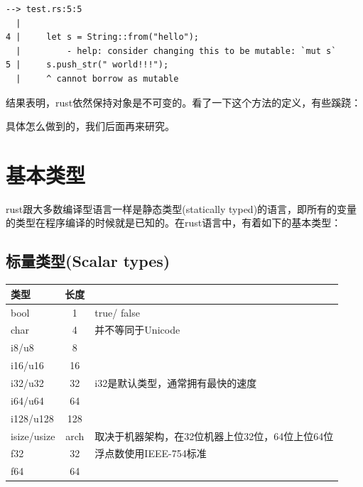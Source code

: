 \documentclass[12pt]{article}
\begin{document}
\begin{verbatim}
--> test.rs:5:5
  |
4 |     let s = String::from("hello");
  |         - help: consider changing this to be mutable: `mut s`
5 |     s.push_str(" world!!!");
  |     ^ cannot borrow as mutable
\end{verbatim}

结果表明，rust依然保持对象是不可变的。看了一下这个方法的定义，有些蹊跷：

\begin{Shaded}
\begin{Highlighting}[]
 \OperatorTok{\&} \OperatorTok{,}\OperatorTok{:} \OperatorTok{\&}\NormalTok{) }\OperatorTok{\{}
\OperatorTok{\}}
\end{Highlighting}
\end{Shaded}

具体怎么做到的，我们后面再来研究。

\section{基本类型}\label{ux57faux672cux7c7bux578b}

rust跟大多数编译型语言一样是静态类型(statically typed)的语言，即所有的变量的类型在程序编译的时候就是已知的。在rust语言中，有着如下的基本类型：

\subsection{标量类型(Scalar types)}\label{ux6807ux91cfux7c7bux578bscalar-types}

{\def\LTcaptype{none} %
\begin{longtable}[]{@{}lcl@{}}
\toprule\noalign{}
类型 & 长度 & \\
\midrule\noalign{}
\endhead
\bottomrule\noalign{}
\endlastfoot
bool & 1 & true/ false \\
char & 4 & 并不等同于Unicode \\
i8/u8 & 8 & \\
i16/u16 & 16 & \\
i32/u32 & 32 & i32是默认类型，通常拥有最快的速度 \\
i64/u64 & 64 & \\
i128/u128 & 128 & \\
isize/usize & arch & 取决于机器架构，在32位机器上位32位，64位上位64位 \\
f32 & 32 & 浮点数使用IEEE-754标准 \\
f64 & 64 & \\
\end{longtable}
}
\end{document}
